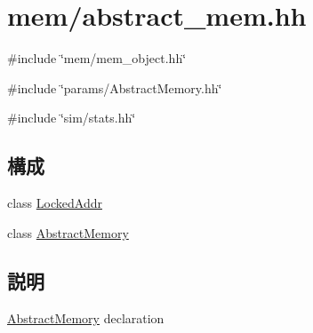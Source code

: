 \hypertarget{abstract__mem_8hh}{
\section{mem/abstract\_\-mem.hh}
\label{abstract__mem_8hh}
}
{\ttfamily \#include \char`\"{}mem/mem\_\-object.hh\char`\"{}}\par
{\ttfamily \#include \char`\"{}params/AbstractMemory.hh\char`\"{}}\par
{\ttfamily \#include \char`\"{}sim/stats.hh\char`\"{}}\par
\subsection*{構成}
\begin{DoxyCompactItemize}
\item 
class \hyperlink{classLockedAddr}{LockedAddr}
\item 
class \hyperlink{classAbstractMemory}{AbstractMemory}
\end{DoxyCompactItemize}


\subsection{説明}
\hyperlink{classAbstractMemory}{AbstractMemory} declaration 